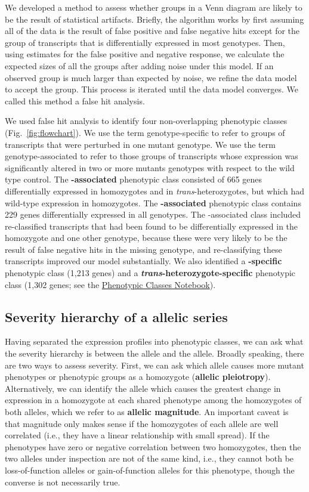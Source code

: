 We developed a method to assess whether groups in a Venn diagram are likely to
be the result of statistical artifacts. Briefly, the algorithm works by first
assuming all of the data is the result of false positive and false negative hits
except for the group of transcripts that is differentially expressed in most
genotypes. Then, using estimates for the false positive and negative response,
we calculate the expected sizes of all the groups after adding noise under this
model. If an observed group is much larger than expected by noise, we refine the
data model to accept the group. This process is iterated until the data model
converges. We called this method a false hit analysis.

We used false hit analysis to identify four non-overlapping phenotypic classes
(Fig.~\ref{fig:flowchart}). We use the term genotype-specific to refer to groups
of transcripts that were perturbed in one mutant genotype. We use the term
genotype-associated to refer to those groups of transcripts whose expression was
significantly altered in two or more mutants genotypes with respect to the wild
type control. The \textbf{\sy{}-associated} phenotypic class consisted of 665
genes differentially expressed in \sy{} homozygotes and in
\emph{trans}-heterozygotes, but which had wild-type expression in \bx{}
homozygotes. The \textbf{\bx{}-associated} phenotypic class contains 229 genes
differentially expressed in all genotypes. The \bx{}-associated class included
re-classified transcripts that had been found to be differentially expressed in
the \bx{} homozygote and one other genotype, because these were very likely to
be the result of false negative hits in the missing genotype, and re-classifying
these transcripts improved our model substantially. We also identified a
\textbf{\sy{}-specific} phenotypic class (1,213 genes) and a
\textbf{\emph{trans}-heterozygote-specific} phenotypic class (1,302 genes; see
the
\href{https://wormlabcaltech.github.io/med-cafe/notebook/phenotypic_classes.html}{
Phenotypic Classes Notebook}).

\subsection*{Severity hierarchy of a  allelic series}
Having separated the expression profiles into phenotypic classes, we can ask
what the severity hierarchy is between the \bx{} allele and the \sy{} allele.
Broadly speaking, there are two ways to assess severity. First, we can ask which
allele causes more mutant phenotypes or phenotypic groups as a homozygote
(\textbf{allelic pleiotropy}). Alternatively, we can identify the allele which
causes the greatest change in expression in a homozygote at each shared
phenotype among the homozygotes of both alleles, which we refer to as
\textbf{allelic magnitude}. An important caveat is that magnitude only makes
sense if the homozygotes of each allele are well correlated (i.e., they have a
linear relationship with small spread). If the phenotypes have zero or negative
correlation between two homozygotes, then the two alleles under inspection are
not of the same kind, i.e., they cannot both be loss-of-function alleles or
gain-of-function alleles for this phenotype, though the converse is not
necessarily true.

